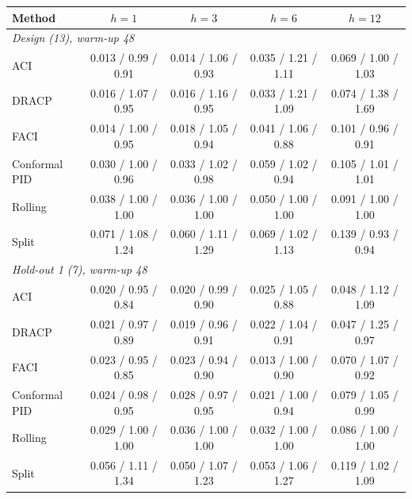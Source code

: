 \begin{tabular}{lcccc}
\toprule
Method & $h{=}1$ & $h{=}3$ & $h{=}6$ & $h{=}12$ \\
\midrule
\multicolumn{5}{l}{\emph{Design (13), warm-up 48}} \\
ACI & 0.013 / 0.99 / 0.91 & 0.014 / 1.06 / 0.93 & 0.035 / 1.21 / 1.11 & 0.069 / 1.00 / 1.03 \\
DRACP & 0.016 / 1.07 / 0.95 & 0.016 / 1.16 / 0.95 & 0.033 / 1.21 / 1.09 & 0.074 / 1.38 / 1.69 \\
FACI & 0.014 / 1.00 / 0.95 & 0.018 / 1.05 / 0.94 & 0.041 / 1.06 / 0.88 & 0.101 / 0.96 / 0.91 \\
Conformal PID & 0.030 / 1.00 / 0.96 & 0.033 / 1.02 / 0.98 & 0.059 / 1.02 / 0.94 & 0.105 / 1.01 / 1.01 \\
Rolling & 0.038 / 1.00 / 1.00 & 0.036 / 1.00 / 1.00 & 0.050 / 1.00 / 1.00 & 0.091 / 1.00 / 1.00 \\
Split & 0.071 / 1.08 / 1.24 & 0.060 / 1.11 / 1.29 & 0.069 / 1.02 / 1.13 & 0.139 / 0.93 / 0.94 \\
\midrule
\multicolumn{5}{l}{\emph{Hold-out 1 (7), warm-up 48}} \\
ACI & 0.020 / 0.95 / 0.84 & 0.020 / 0.99 / 0.90 & 0.025 / 1.05 / 0.88 & 0.048 / 1.12 / 1.09 \\
DRACP & 0.021 / 0.97 / 0.89 & 0.019 / 0.96 / 0.91 & 0.022 / 1.04 / 0.91 & 0.047 / 1.25 / 0.97 \\
FACI & 0.023 / 0.95 / 0.85 & 0.023 / 0.94 / 0.90 & 0.013 / 1.00 / 0.90 & 0.070 / 1.07 / 0.92 \\
Conformal PID & 0.024 / 0.98 / 0.95 & 0.028 / 0.97 / 0.95 & 0.021 / 1.00 / 0.94 & 0.079 / 1.05 / 0.99 \\
Rolling & 0.029 / 1.00 / 1.00 & 0.036 / 1.00 / 1.00 & 0.032 / 1.00 / 1.00 & 0.086 / 1.00 / 1.00 \\
Split & 0.056 / 1.11 / 1.34 & 0.050 / 1.07 / 1.23 & 0.053 / 1.06 / 1.27 & 0.119 / 1.02 / 1.09 \\
\bottomrule
\end{tabular}
